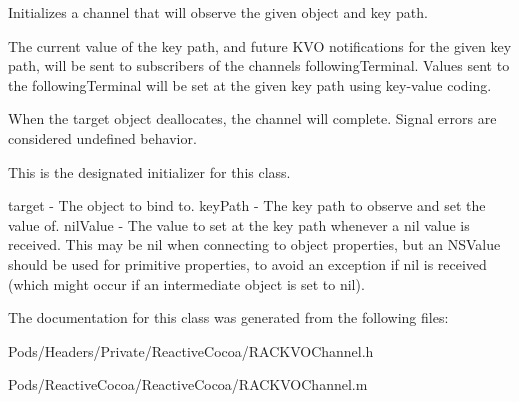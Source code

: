 Initializes a channel that will observe the given object and key path.

The current value of the key path, and future K\+VO notifications for the given key path, will be sent to subscribers of the channel\textquotesingle{}s {\ttfamily following\+Terminal}. Values sent to the {\ttfamily following\+Terminal} will be set at the given key path using key-\/value coding.

When the target object deallocates, the channel will complete. Signal errors are considered undefined behavior.

This is the designated initializer for this class.

target -\/ The object to bind to. key\+Path -\/ The key path to observe and set the value of. nil\+Value -\/ The value to set at the key path whenever a {\ttfamily nil} value is received. This may be nil when connecting to object properties, but an N\+S\+Value should be used for primitive properties, to avoid an exception if {\ttfamily nil} is received (which might occur if an intermediate object is set to {\ttfamily nil}). 

The documentation for this class was generated from the following files\+:\begin{DoxyCompactItemize}
\item 
Pods/\+Headers/\+Private/\+Reactive\+Cocoa/R\+A\+C\+K\+V\+O\+Channel.\+h\item 
Pods/\+Reactive\+Cocoa/\+Reactive\+Cocoa/R\+A\+C\+K\+V\+O\+Channel.\+m\end{DoxyCompactItemize}
